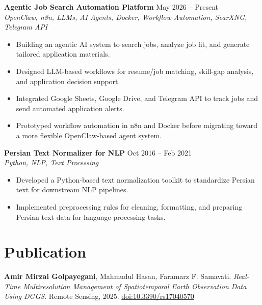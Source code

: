 \documentclass[a4paper,10pt]{article}
\newcommand{\resumeSubheading}[4]{
    \textbf{#1} \hfill #2 \\
    \textit{#3} \hfill \textit{#4}
}
\begin{document}
\noindent
\textbf{Agentic Job Search Automation Platform} \hfill May 2026 -- Present \\
\textit{OpenClaw, n8n, LLMs, AI Agents, Docker, Workflow Automation, SearXNG, Telegram API}
\begin{itemize}[leftmargin=0.25in]
    \item Building an agentic AI system to search jobs, analyze job fit, and generate tailored application materials.
    \item Designed LLM-based workflows for resume/job matching, skill-gap analysis, and application decision support.
    \item Integrated Google Sheets, Google Drive, and Telegram API to track jobs and send automated application alerts.
    \item Prototyped workflow automation in n8n and Docker before migrating toward a more flexible OpenClaw-based agent system.
\end{itemize}

\noindent
\textbf{Persian Text Normalizer for NLP} \hfill Oct 2016 -- Feb 2021 \\
\textit{Python, NLP, Text Processing}
\begin{itemize}[leftmargin=0.25in]
    \item Developed a Python-based text normalization toolkit to standardize Persian text for downstream NLP pipelines.
    \item Implemented preprocessing rules for cleaning, formatting, and preparing Persian text data for language-processing tasks.
\end{itemize}

\section*{Publication}

\textbf{Amir Mirzai Golpayegani}, Mahmudul Hasan, Faramarz F. Samavati.
\textit{Real-Time Multiresolution Management of Spatiotemporal Earth Observation Data Using DGGS}.
Remote Sensing, 2025. \href{https://doi.org/10.3390/rs17040570}{doi:10.3390/rs17040570}



\end{document}
